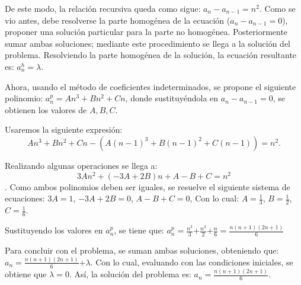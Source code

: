 \documentclass{report}
\begin{document}
De este modo, la relación recursiva queda como sigue:
$a_{n}-a_{n-1}=n^2$.  Como se vio antes, debe resolverse la parte
homogénea de la ecuación ($a_n-a_{n-1}=0$), proponer una solución
particular para la parte no homogénea. Posteriormente sumar ambas
soluciones; mediante este procedimiento se llega a la solución del problema.
Resolviendo la parte homogénea de la solución, la ecuación resultante
es: $a^h_n=\lambda$.

Ahora, usando el método de coeficientes indeterminados, se propone el
siguiente polinomio: $a^p_n=An^3+Bn^2+Cn$, donde sustituyéndola en
$a_n-a_{n-1}=0$, se obtienen los valores de $A,B,C$.

Usaremos la siguiente expresión:
\begin{equation}
  \label{polinomial}
   An^3+Bn^2+Cn-(A(n-1)^3+B(n-1)^2+C(n-1))=n^2.  
\end{equation}

Realizando algunas operaciones se llega a:
$$3An^2+(-3A+2B)n+A-B+C=n^2$$.
Como ambos polinomios deben ser iguales, se resuelve el siguiente sistema de ecuaciones:
$3A=1$,
$-3A+2B=0$,
$A-B+C=0$,
Con lo cual: $A=\frac{1}{3}$, $B=\frac{1}{2}$, $C=\frac{1}{6}$.

Sustituyendo los valores en $a^p_n$, se tiene que:
$a^p_n=\frac{n^3}{3}$$+\frac{n^2}{2}$$+\frac{n}{6}=$$\frac{n(n+1)(2n+1)}{6}$

Para concluir con el problema, se suman ambas soluciones, obteniendo que:
$a_n=\frac{n(n+1)(2n+1)}{6}$$+\lambda$.
Con lo cual, evaluando con las condiciones iniciales, se obtiene que $\lambda$$=0$.
Así, la solución del problema es:
$a_n=\frac{n(n+1)(2n+1)}{6}$.
\end{document}
